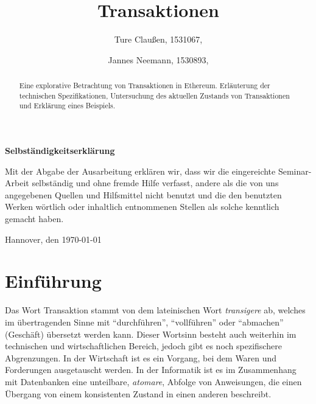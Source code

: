 \documentclass[runningheads]{llncs}
\begin{document}
\title{Transaktionen}
\author{Ture Claußen, 1531067,  \and Jannes Neemann, 1530893, }

{\def\addcontentsline#1#2#3{}\maketitle} %

\begin{center} \sffamily\bfseries Selbständigkeitserklärung \end{center}

Mit der Abgabe der Ausarbeitung erklären wir, dass wir die eingereichte Seminar-Arbeit
selbständig und ohne fremde Hilfe verfasst, andere als die von uns angegebenen Quellen
und Hilfsmittel nicht benutzt und die den benutzten Werken wörtlich oder
inhaltlich entnommenen Stellen als solche kenntlich gemacht haben.
\vspace*{7ex}

Hannover, den \today \hfill

\begin{abstract}
  Eine explorative Betrachtung von Transaktionen in Ethereum. Erläuterung der technischen Spezifikationen, Untersuchung des aktuellen Zustands von Transaktionen und Erklärung eines Beispiels.

\end{abstract}

\section{Einführung}
Das Wort Transaktion stammt von dem lateinischen Wort \textit{transigere} ab, welches im übertragenden Sinne mit "`durchführen"', "`vollführen"' oder "`abmachen"' (Geschäft) übersetzt werden kann. \cite{noauthor_transigere_nodate} Dieser Wortsinn besteht auch weiterhin im technischen und wirtschaftlichen Bereich, jedoch gibt es noch spezifischere Abgrenzungen. In der Wirtschaft ist es ein Vorgang, bei dem Waren und Forderungen ausgetauscht werden. \cite[S. 18 f.]{ehrlicher_kompendium_1975} In der Informatik ist es im Zusammenhang mit Datenbanken eine unteilbare, \textit{atomare}, Abfolge von Anweisungen, die einen Übergang von einem konsistenten Zustand in einen anderen beschreibt. \cite[S.520]{herold_grundlagen_2017}
\end{document}
